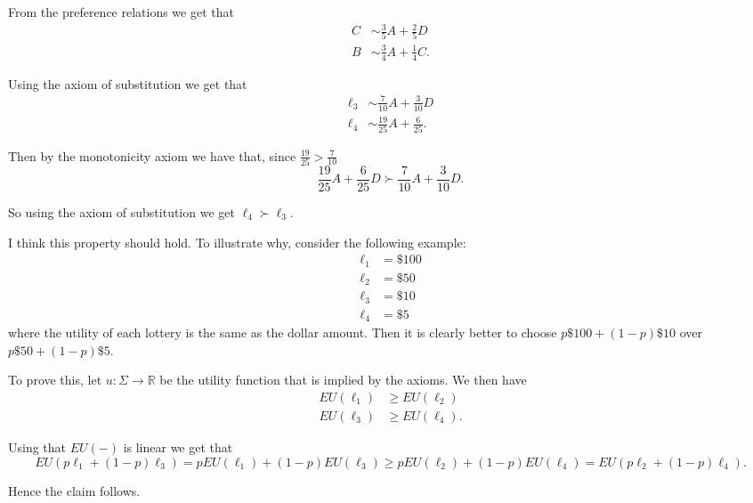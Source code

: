 \documentclass[a4paper]{article}
\begin{document}
  \begin{exercise}{6}
    From the preference relations we get that
    \begin{align*}
      C &\sim \frac{3}{5}A + \frac{2}{5}D \\
      B &\sim \frac{3}{4}A + \frac{1}{4}C
    .\end{align*}

    Using the axiom of substitution we get that
    \begin{align*}
      \ell_3 &\sim \frac{7}{10}A + \frac{3}{10}D \\
      \ell_4 &\sim \frac{19}{25}A + \frac{6}{25}
    .\end{align*}

    Then by the monotonicity axiom we have that, since $ \frac{19}{25} > \frac{7}{10} $
    \begin{equation*}
    \frac{19}{25}A + \frac{6}{25}D \succ \frac{7}{10}A + \frac{3}{10}D
    .\end{equation*}

    So using the axiom of substitution we get $ \ell_4 \succ \ell_3 $.
  \end{exercise}

  \begin{exercise}{7}
    I think this property should hold. To illustrate why, consider the following example:
    \begin{align*}
      \ell_1 &= \$100 \\
      \ell_2 &= \$50 \\
      \ell_3 &= \$10 \\
      \ell_4 &= \$5
    \end{align*}
    where the utility of each lottery is the same as the dollar amount. Then it is clearly better to choose $ p\$100 + (1-p)\$10 $ over $ p\$50 + (1-p)\$5 $.

    To prove this, let $ u: \Sigma \to \mathbb{R} $ be the utility function that is implied by the axioms. We then
    have
    \begin{align*}
      EU(\ell_1) &\geq EU(\ell_2) \\
      EU(\ell_3) &\geq EU(\ell_4)
    .\end{align*}

    Using that $ EU(-) $ is linear we get that
    \begin{equation*}
    EU(p\ell_1 + (1-p)\ell_3) = pEU(\ell_1)+ (1-p)EU(\ell_3) \geq pEU(\ell_2) + (1-p)EU(\ell_4) = EU(p\ell_2 + (1-p)\ell_4)
    .\end{equation*}

    Hence the claim follows.
  \end{exercise}
\end{document}
